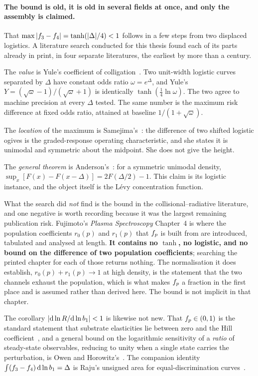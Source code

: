 \paragraph{The bound is old, it is old in several fields at once, and only the
assembly is claimed.} That $\max|f_{3}-f_{4}| = \tanh(|\Delta|/4) < 1$
follows in a few steps from two displaced logistics. A literature search
conducted for this thesis found each of its parts already in print, in four
separate literatures, the earliest by more than a century.

The \emph{value} is Yule's coefficient of colligation~\cite{Yule1912}. Two
unit-width logistic curves separated by $\Delta$ have constant odds ratio
$\omega = e^{\Delta}$, and Yule's $Y = (\sqrt{\omega}-1)/(\sqrt{\omega}+1)$ is
identically $\tanh(\tfrac14\ln\omega)$. The two agree to machine precision at
every $\Delta$ tested. The same number is the maximum risk difference at fixed
odds ratio, attained at baseline $1/(1+\sqrt{\omega})$.

The \emph{location} of the maximum is Samejima's~\cite{Samejima1969}: the
difference of two shifted logistic ogives is the graded-response operating
characteristic, and she states it is unimodal and symmetric about the midpoint.
She does not give the height.

The \emph{general theorem} is Anderson's~\cite{Anderson1955}: for a symmetric
unimodal density, $\sup_x[F(x)-F(x-\Delta)] = 2F(\Delta/2)-1$. This claim is its
logistic instance, and the object itself is the L\'evy concentration function.

What the search did \emph{not} find is the bound in the
collisional--radiative literature, and one negative is worth recording because
it was the largest remaining publication risk. Fujimoto's
\emph{Plasma Spectroscopy} Chapter~4 \cite{Fujimoto2004} is where the
population coefficients $r_0(p)$ and $r_1(p)$ that $f_{p}$ is built from are
introduced, tabulated and analysed at length. \textbf{It contains no $\tanh$, no
logistic, and no bound on the difference of two population coefficients};
searching the printed chapter for each of those returns nothing. The
normalisation it does establish, $r_0(p) + r_1(p) \to 1$ at high density, is the
statement that the two channels exhaust the population, which is what makes
$f_{p}$ a fraction in the first place and is assumed rather than derived
here. The bound is not implicit in that chapter.

The corollary $|\mathrm{d}\ln R/\mathrm{d}\ln b_1| < 1$ is likewise not new.
That $f_{p}\in(0,1)$ is the standard statement that substrate elasticities
lie between zero and the Hill coefficient~\cite{CornishBowden2012}, and a
general bound on the logarithmic sensitivity of a \emph{ratio} of steady-state
observables, reducing to unity when a single state carries the
perturbation, is Owen and Horowitz's~\cite{OwenHorowitz2023}. The companion
identity $\int(f_{3}-f_{4})\,\mathrm{d}\ln b_1 = \Delta$ is Raju's
unsigned area for equal-discrimination curves~\cite{Raju1988}.

